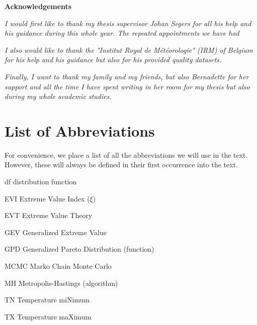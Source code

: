 \documentclass[11pt,a4paper,openany ]{book}
\newcommand{\abbrlabel}[1]{\makebox[3cm][l]{\textbf{#1}\ \dotfill}}
\newenvironment{abbreviations}{\begin{list}{}{\renewcommand{\makelabel}{\abbrlabel}}}{\end{list}}
\newcommand\blankpage{%
    \null
    \thispagestyle{empty}%
    \addtocounter{page}{-1}%
    \newpage}
\begin{document}
\newenvironment{acknowledgements}%
{\thispagestyle{empty}\null\vfill\begin{center}%
\bfseries Acknowledgements\end{center}}%
{\vfill\null}
\begin{acknowledgements}
	\textit{I would first like to thank my thesis supervisor Johan Segers for all his help and his guidance during this whole year. The repeated appointments we have had   }
	\newline
	
	\textit{I also would like to thank the "Institut Royal de Météorologie" (IRM) of Belgium for his help and his guidance but also for his provided quality datasets.}
	\newline
	
	\textit{Finally, I want to thank my family and my friends, but also Bernadette for her support and all the time I have spent  writing in her room for my thesis but also during my whole academic studies.}
	\thispagestyle{empty}
\end{acknowledgements}


\afterpage{\blankpage}


\thispagestyle{empty}
\dominitoc
\thispagestyle{empty}
\tableofcontents
\thispagestyle{empty}
\newpage
\thispagestyle{empty}
\listoffigures
\thispagestyle{empty}

\newpage


\chapter*{List of Abbreviations}
\thispagestyle{empty}
For convenience, we place a list of all the abbreviations we will use in the text. However, these will always be defined in their first occurrence into the text.\\

\begin{center}
\begin{abbreviations}
	\item [df]\label{df}  distribution function
	\item[EVI] Extreme Value Index ($\xi$)
	\item[EVT] Extreme Value Theory
	\item[GEV] Generalized Extreme Value
	\item[GPD] Generalized Pareto Distribution (function)
	\item[MCMC] Marko Chain Monte Carlo
	\item[MH] Metropolis-Hastings (algorithm)
	\item[TN] Temperature miNimum
	\item[TX] Temperature maXimum
	
\end{abbreviations}
\end{center}
\end{document}
